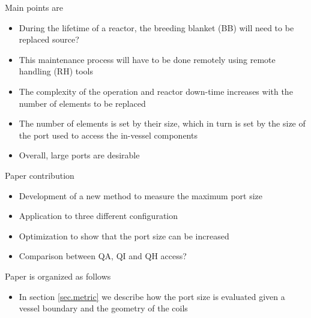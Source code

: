 \documentclass[12pt]{article}
\begin{document}
Main points are
\begin{itemize}
    \item During the lifetime of a reactor, the breeding blanket (BB) will need to be replaced {\color{red}source?}
    \item This maintenance process will have to be done remotely using remote handling (RH) tools
    \item The complexity of the operation and reactor down-time increases with the number of elements to be replaced
    \item The number of elements is set by their size, which in turn is set by the size of the port used to access the in-vessel components
    \item Overall, large ports are desirable
\end{itemize}

Paper contribution
\begin{itemize}
    \item Development of a new method to measure the maximum port size
    \item Application to three different configuration 
    \item Optimization to show that the port size can be increased
    \item Comparison between QA, QI and QH access?
\end{itemize}

Paper is organized as follows
\begin{itemize}
    \item In section \ref{sec.metric} we describe how the port size is evaluated given a vessel boundary and the geometry of the coils
\end{itemize}
\end{document}
